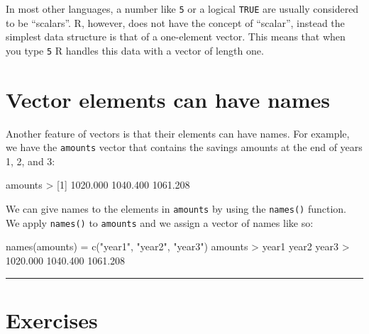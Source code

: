 \documentclass[
]{book}
\newenvironment{Shaded}{\begin{snugshade}}{\end{snugshade}}
\newcommand{\DecValTok}[1]{\textcolor[rgb]{0.00,0.00,0.81}{#1}}
\newcommand{\FloatTok}[1]{\textcolor[rgb]{0.00,0.00,0.81}{#1}}
\newcommand{\FunctionTok}[1]{\textcolor[rgb]{0.00,0.00,0.00}{#1}}
\newcommand{\NormalTok}[1]{#1}
\newcommand{\OtherTok}[1]{\textcolor[rgb]{0.56,0.35,0.01}{#1}}
\newcommand{\SpecialCharTok}[1]{\textcolor[rgb]{0.00,0.00,0.00}{#1}}
\newcommand{\StringTok}[1]{\textcolor[rgb]{0.31,0.60,0.02}{#1}}
\begin{document}
In most other languages, a number like \texttt{5} or a logical \texttt{TRUE} are usually
considered to be ``scalars''. R, however, does not have the concept of ``scalar'',
instead the simplest data structure is that of a one-element vector. This means
that when you type \texttt{5} R handles this data with a vector of length one.

\hypertarget{vector-elements-can-have-names}{%
\section{Vector elements can have names}\label{vector-elements-can-have-names}}

Another feature of vectors is that their elements can have names. For example,
we have the \texttt{amounts} vector that contains the savings amounts at the end of
years 1, 2, and 3:

\begin{Shaded}
\begin{Highlighting}[]
\NormalTok{amounts}
\SpecialCharTok{\textgreater{}}\NormalTok{ [}\DecValTok{1}\NormalTok{] }\FloatTok{1020.000} \FloatTok{1040.400} \FloatTok{1061.208}
\end{Highlighting}
\end{Shaded}

We can give names to the elements in \texttt{amounts} by using the \texttt{names()} function.
We apply \texttt{names()} to \texttt{amounts} and we assign a vector of names like so:

\begin{Shaded}
\begin{Highlighting}[]
\FunctionTok{names}\NormalTok{(amounts) }\OtherTok{=} \FunctionTok{c}\NormalTok{(}\StringTok{"year1"}\NormalTok{, }\StringTok{"year2"}\NormalTok{, }\StringTok{"year3"}\NormalTok{)}
\NormalTok{amounts}
\SpecialCharTok{\textgreater{}}\NormalTok{    year1    year2    year3 }
\SpecialCharTok{\textgreater{}} \FloatTok{1020.000} \FloatTok{1040.400} \FloatTok{1061.208}
\end{Highlighting}
\end{Shaded}

\begin{center}\rule{0.5\linewidth}{0.5pt}\end{center}

\hypertarget{exercises-1}{%
\section{Exercises}\label{exercises-1}}
\end{document}
